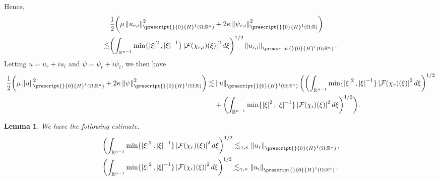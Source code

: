 \documentclass[11pt,letterpaper,reqno]{amsart}
\newtheorem{lemma}[theorem]{Lemma}
\numberwithin{equation}{section}
\newcommand{\abs}[1]{\left\lvert#1\right\rvert}
\newcommand{\norm}[1]{\left\lVert#1\right\rVert}
\begin{document}
Hence,
\begin{align}
    &\frac{1}{2}\biggl(\mu\norm{u_{r,i}}_{\prescript{}{0}{H}^{1}(\Omega;\mathbb{R}^{n})}^{2}+2\kappa\norm{\psi_{r,i}}_{\prescript{}{0}{H}^{1}(\Omega;\mathbb{R})}^{2}\biggr) \\
    \lesssim&\biggl(\int_{\mathbb{R}^{n-1}}\min\{\abs{\xi}^{2},\abs{\xi}^{-1}\}\abs{\mathcal{F}(\chi_{r,i})(\xi)}^{2}d\xi\biggr)^{1/2}\norm{u_{r,i}}_{\prescript{}{0}{H}^{1}(\Omega;\mathbb{R}^{n})}.
\end{align}
Letting \(u=u_{r}+iu_{i}\) and \(\psi=\psi_{r}+i\psi_{i}\), we then have
\begin{align}
    \frac{1}{2}\biggl(\mu\norm{u}_{\prescript{}{0}{H}^{1}(\Omega;\mathbb{R}^{n})}^{2}+2\kappa\norm{\psi}_{\prescript{}{0}{H}^{1}(\Omega;\mathbb{R})}^{2}\biggr) \lesssim &\norm{u}_{\prescript{}{0}{H}^{1}(\Omega;\mathbb{R}^{n})}\biggl(\biggl(\int_{\mathbb{R}^{n-1}}\min\{\abs{\xi}^{2},\abs{\xi}^{-1}\}\abs{\mathcal{F}(\chi_{r})(\xi)}^{2}d\xi\biggr)^{1/2}  \nonumber\\
    &+\biggl(\int_{\mathbb{R}^{n-1}}\min\{\abs{\xi}^{2},\abs{\xi}^{-1}\}\abs{\mathcal{F}(\chi_{i})(\xi)}^{2}d\xi\biggr)^{1/2}\biggr). \label{compnorm}
\end{align}
\begin{lemma} \label{energyestimate}
    We have the following estimate.
    \begin{align}
        &\biggl(\int_{\mathbb{R}^{n-1}}\min\{\abs{\xi}^{2},\abs{\xi}^{-1}\}\abs{\mathcal{F}(\chi_{r})(\xi)}^{2}d\xi\biggr)^{1/2} \lesssim_{\gamma,\kappa} \norm{u_{r}}_{\prescript{}{0}{H}^{1}(\Omega;\mathbb{R}^{n})}, \label{estimater} \\
        &\biggl(\int_{\mathbb{R}^{n-1}}\min\{\abs{\xi}^{2},\abs{\xi}^{-1}\}\abs{\mathcal{F}(\chi_{i})(\xi)}^{2}d\xi\biggr)^{1/2} \lesssim_{\gamma,\kappa} \norm{u_{i}}_{\prescript{}{0}{H}^{1}(\Omega;\mathbb{R}^{n})}. \label{estimatei}
    \end{align}
\end{lemma}
\end{document}
